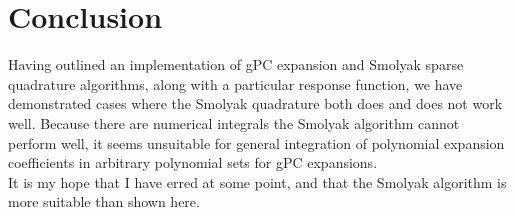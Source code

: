 \documentclass[11pt]{article}
\begin{document}
\section{Conclusion}
Having outlined an implementation of gPC expansion and Smolyak sparse quadrature algorithms, along with a
particular response function, we have demonstrated cases where the Smolyak quadrature both does and does not
work well.  Because there are numerical integrals the Smolyak algorithm cannot perform well, it seems
unsuitable for general integration of polynomial expansion coefficients in arbitrary polynomial sets for gPC
expansions.\\

It is my hope that I have erred at some point, and that the Smolyak algorithm is more suitable than shown
here.
\end{document}
